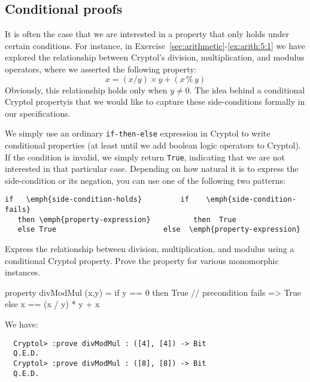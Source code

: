 \subsection{Conditional proofs}
\label{sec:condproof}

It is often the case that we are interested in a property that only
holds under certain conditions.  For instance, in
Exercise~\ref{sec:arithmetic}-\ref{ex:arith:5:1} we have explored the
relationship between Cryptol's division, multiplication, and modulus
operators, where we asserted the following
property:\indMod\indDiv\indTimes
$$
  x = (x / y) \times y + (x\,\%\,y)
$$
Obviously, this relationship holds only when $y \not= 0$. The idea
behind a conditional Cryptol property\indThmCond is that we would like
to capture these side-conditions formally in our specifications. 

We simply use an ordinary {\tt if-then-else} expression in Cryptol to
write conditional properties (at least until we add boolean logic
operators to Cryptol).  If the condition is invalid, we simply return
{\tt True}, indicating that we are not interested in that particular
case. Depending on how natural it is to express the side-condition or
its negation, you can use one of the following two patterns:
\begin{Verbatim}[commandchars=\\\{\}]
   if   \emph{side-condition-holds}         if    \emph{side-condition-fails}
   then \emph{property-expression}          then  True
   else True                         else  \emph{property-expression}
\end{Verbatim}

\begin{Exercise}\label{ex:cond:1}
  Express the relationship between division, multiplication, and
  modulus using a conditional Cryptol property.  Prove the property
  for various monomorphic instances.\indMod\indDiv\indTimes\indThmCond
\end{Exercise}
\begin{Answer}
\begin{code}
  property divModMul (x,y) = if y == 0
                             then True   // precondition fails => True
                             else x == (x / y) * y + x %
\end{code}
We have:
\begin{Verbatim}
  Cryptol> :prove divModMul : ([4], [4]) -> Bit
  Q.E.D.
  Cryptol> :prove divModMul : ([8], [8]) -> Bit
  Q.E.D.
\end{Verbatim}
\end{Answer}

